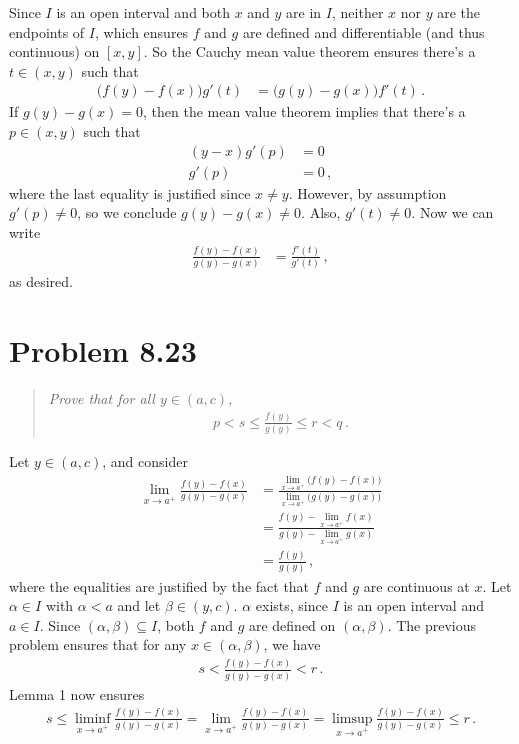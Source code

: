 \documentclass{article}
\begin{document}
Since $I$ is an open interval and both $x$ and $y$ are in $I$, neither
$x$ nor $y$ are the endpoints of $I$, which ensures $f$ and $g$
are defined and differentiable (and thus continuous) on $[x, y]$.
So the Cauchy mean value theorem ensures there's a $t \in (x, y)$
such that
\begin{align*}
    \bigl( f(y) - f(x) \bigr) g'(t) &= \bigl( g(y) - g(x) \bigr) f'(t) \,.
\end{align*}
If $g(y) - g(x) = 0$, then the mean value theorem implies that
there's a $p \in (x, y)$ such that
\begin{align*}
    (y-x)g'(p) &= 0 \\
    g'(p) &= 0 \,,
\end{align*}
where the last equality is justified since $x \neq y$.
However, by assumption $g'(p) \neq 0$, so we conclude
$g(y)-g(x) \neq 0$. Also, $g'(t) \neq 0$. Now we can write
\begin{align*}
    \frac{f(y) - f(x)}{g(y) - g(x)} &= \frac{f'(t)}{g'(t)} \,,
\end{align*}
as desired. \qedsymbol

\section*{Problem 8.23}

\begin{quote}
    \itshape
    Prove that for all $y \in (a,c)$,
    \begin{align*}
        p < s \leq \frac{f(y)}{g(y)} \leq r < q \,.
    \end{align*}
\end{quote}

Let $y \in (a, c)$, and consider
\begin{align*}
    \lim_{x \to a^+} \frac{f(y) - f(x)}{g(y) - g(x)}
    &=  \frac{\lim_{x \to a^+} \bigl( f(y) - f(x) \bigr)}{\lim_{x \to a^+} \bigl(g(y) - g(x)\bigr)} \\
    &=  \frac{f(y) - \lim_{x \to a^+} f(x) }{ g(y) - \lim_{x \to a^+} g(x)} \\
    &= \frac{f(y)}{g(y)} \,,
\end{align*}
where the equalities are justified by the fact that
$f$ and $g$ are continuous at $x$.
Let $\alpha \in I$ with $\alpha < a$ and let $\beta \in (y, c)$.
$\alpha$ exists, since $I$ is an open interval and $a \in I$.
Since $(\alpha, \beta) \subseteq I$, both $f$ and $g$ are defined on
$(\alpha, \beta)$.
The previous problem ensures that for any $x \in (\alpha, \beta)$, we have
\begin{align*}
    s < \frac{f(y) - f(x)}{g(y) - g(x)} < r \,.
\end{align*}
Lemma 1 now ensures
\begin{align*}
    s \leq \liminf_{x \to a^+} \frac{f(y) - f(x)}{g(y) - g(x)}
    = \lim_{x \to a^+} \frac{f(y) - f(x)}{g(y) - g(x)}
    = \limsup_{x \to a^+} \frac{f(y) - f(x)}{g(y) - g(x)}
    \leq r \,.
\end{align*}
\qedsymbol
\end{document}
